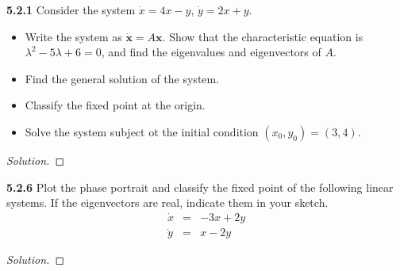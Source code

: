 \documentclass[10pt]{amsart}
\newenvironment{solution}
{\begin{proof}[Solution]}
{\end{proof}}
\begin{document}
\begin{onehalfspace}
        \noindent\textbf{5.2.1} Consider the system $\dot{x} = 4x - y$, $\dot{y} = 2x + y$.
        \begin{itemize}
            \item[a)] Write the system as $\mathbf{\dot{x}} = A \mathbf{x}$.
            Show that the characteristic equation is $\lambda^2 - 5\lambda + 6 = 0$,
            and find the eigenvalues and eigenvectors of $A$.
            \item[b)] Find the general solution of the system.
            \item[c)] Classify the fixed point at the origin.
            \item[d)] Solve the system subject ot the initial condition $(x_0, y_0) = (3, 4)$.
        \end{itemize}

        \begin{solution}
        \end{solution}

        \noindent\textbf{5.2.6} Plot the phase portrait and classify the fixed point of the following
        linear systems.
        If the eigenvectors are real, indicate them in your sketch.
        \begin{eqnarray*}
            \dot{x} & = & -3x + 2y \\
            \dot{y} & = & x - 2y
        \end{eqnarray*}

        \begin{solution}
        \end{solution}

    \end{onehalfspace}
\end{document}
